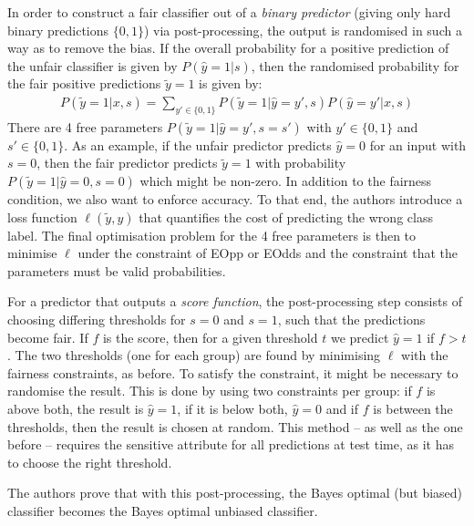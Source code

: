 In order to construct a fair classifier out of a \emph{binary predictor}
(giving only hard binary predictions $\{0, 1\}$) via post-processing,
the output is randomised in such a way as to remove the bias.
If the overall probability for a positive prediction of the unfair classifier is given by \(P(\hat{y}=1|s)\),
then the randomised probability for the fair positive predictions \(\tilde{y} = 1\) is given by:
\begin{align}
  \label{eq:hardt}
  P(\tilde{y}=1| x, s) = \sum\limits_{y' \in \{0, 1\}} P(\tilde{y} = 1| \hat{y}=y', s) 
  P(\hat{y}=y'| x, s)
\end{align}
There are 4 free parameters \(P(\tilde{y} = 1| \hat{y}=y', s=s')\) with \(y' \in \{0, 1\}\) and \(s' \in \{0, 1\}\).
As an example, if the unfair predictor predicts \(\hat{y} =0\) for an input with \(s=0\),
then the fair predictor predicts \(\tilde{y} =1\) with probability \(P(\tilde{y} = 1| \hat{y}=0, s=0)\)
which might be non-zero.
In addition to the fairness condition, we also want to enforce accuracy.
To that end, the authors introduce a loss function \(\ell (\tilde{y}, y)\)
that quantifies the cost of predicting the wrong class label.
The final optimisation problem for the 4 free parameters is then to minimise \(\ell\)
under the constraint of \ac{EOpp} or \ac{EOdds}
and the constraint that the parameters must be valid probabilities.

For a predictor that outputs a \emph{score function},
the post-processing step consists of choosing differing thresholds for \(s=0\) and \(s=1\),
such that the predictions become fair.
If \(f\) is the score, then for a given threshold \(t\) we predict \(\hat{y} = 1\) if \(f > t\).
The two thresholds (one for each group) are found by minimising \(\ell\) with the fairness constraints, as before.
To satisfy the constraint, it might be necessary to randomise the result.
This is done by using two constraints per group:
if \(f\) is above both, the result is \(\hat{y} = 1\), if it is below both, \(\hat{y} =0\)
and if \(f\) is between the thresholds, then the result is chosen at random.
This method -- as well as the one before --
requires the sensitive attribute for all predictions at test time, as it has to choose the right threshold.

The authors prove that with this post-processing,
the Bayes optimal (but biased) classifier becomes the Bayes optimal unbiased classifier.


